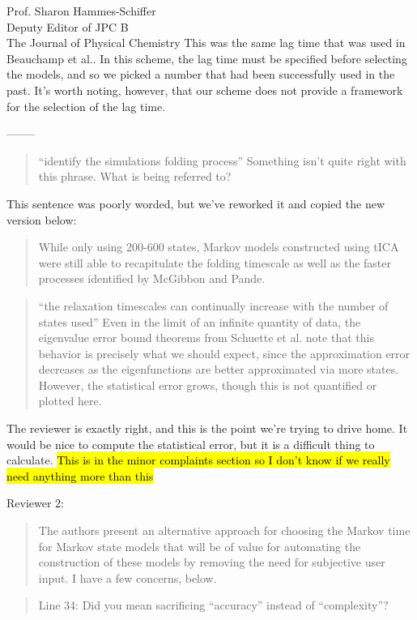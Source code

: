 \documentclass{letter}
\newcommand{\separate}{\begin{center}--------\end{center}}
\begin{document}
\begin{letter}{Prof. Sharon Hammes-Schiffer \\ Deputy Editor of JPC B \\ The Journal of Physical Chemistry}
This was the same lag time that was used in Beauchamp et al.\cite{Beauchamp_shaw_paper}. In this scheme, the lag time must be specified before selecting the models, and so we picked a number that had been successfully used in the past. It's worth noting, however, that our scheme does not provide a framework for the selection of the lag time.
\separate
\begin{quote}
``identify the simulations folding process''  Something isn't quite right with this phrase.  What is being referred to?
\end{quote}

This sentence was poorly worded, but we've reworked it and copied the new version below:
\begin{quote}
While only using 200-600 states, Markov models constructed using tICA were still able to recapitulate the folding timescale as well as the faster processes identified by McGibbon and Pande.
\end{quote}

\begin{quote}
``the relaxation timescales can continually increase with the number of states used''  Even in the limit of an infinite quantity of data, the eigenvalue error bound theorems from Schuette et al. note that this behavior is precisely what we should expect, since the approximation error decreases as the eigenfunctions are better approximated via more states.  However, the statistical error grows, though this is not quantified or plotted here.
\end{quote}

The reviewer is exactly right, and this is the point we're trying to drive home. It would be nice to compute the statistical error, but it is a difficult thing to calculate. \hl{This is in the minor complaints section so I don't know if we really need anything more than this}

Reviewer 2:

\begin{quote}
The authors present an alternative approach for choosing the Markov time for Markov state models that will be of value for automating the construction of these models by removing the need for subjective user input.  I have a few concerns, below.
\end{quote}

\begin{quote}
Line 34: Did you mean sacrificing ``accuracy'' instead of ``complexity''?
\end{quote}


\end{letter}
\end{document}
